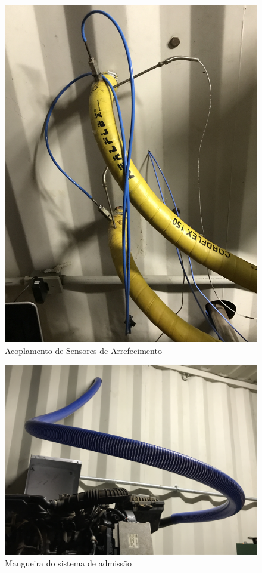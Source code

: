 \begin{figure}[h!]
	\centering
	\includegraphics[angle=270,keepaspectratio=true,scale= 0.09]{figuras/AcoplamentoDeSensoresDeArrefecimento.JPG}
	\caption{Acoplamento de Sensores de Arrefecimento}
	\label{acoplamentoDoMotor}
\end{figure}

\begin{figure}[h!]
	\centering
	\includegraphics[keepaspectratio=true,scale= 0.09]{figuras/SistemaDeAdimissao.JPG}
	\caption{Mangueira do sistema de admissão}
	\label{mangueiraDoSistemaAdmissao}
\end{figure}


